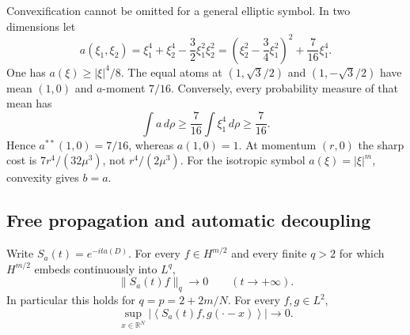 \begin{remark}
Convexification cannot be omitted for a general elliptic symbol. In two dimensions let
\[
 a(\xi_1,\xi_2)=\xi_1^4+\xi_2^4-\frac32\xi_1^2\xi_2^2
 =\left(\xi_2^2-\frac34\xi_1^2\right)^2+\frac7{16}\xi_1^4.
\]
One has $a(\xi)\ge|\xi|^4/8$. The equal atoms at $(1,\sqrt3/2)$ and $(1,-\sqrt3/2)$ have mean $(1,0)$ and $a$-moment $7/16$. Conversely, every probability measure of that mean has
\[
 \int a\,d\rho\ge\frac7{16}\int\xi_1^4\,d\rho\ge\frac7{16}.
\]
Hence $a^{**}(1,0)=7/16$, whereas $a(1,0)=1$. At momentum $(r,0)$ the sharp cost is $7r^4/(32\mu^3)$, not $r^4/(2\mu^3)$. For the isotropic symbol $a(\xi)=|\xi|^m$, convexity gives $b=a$.
\end{remark}

\subsection{Free propagation and automatic decoupling}

\begin{lemma}\label{lem:r8-free-decay}
Write $S_a(t)=e^{-it a(D)}$. For every $f\in H^{m/2}$ and every finite $q>2$ for which $H^{m/2}$ embeds continuously into $L^q$,
\[
 \|S_a(t)f\|_q\longrightarrow0\qquad(t\to+\infty).
\]
In particular this holds for $q=p=2+2m/N$. For every $f,g\in L^2$,
\[
 \sup_{x\in\mathbb R^N}
 \left|\left\langle S_a(t)f,g(\cdot-x)\right\rangle\right|
 \longrightarrow0.
\]
\end{lemma}

